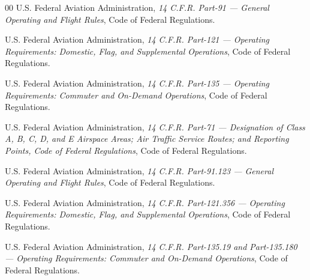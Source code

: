\documentclass[conference]{IEEEtran}
\begin{document}
\begin{thebibliography}{00}
U.S. Federal Aviation Administration,
\textit{14 C.F.R. Part-91 — General Operating and Flight Rules},
Code of Federal Regulations.

U.S. Federal Aviation Administration,
\textit{14 C.F.R. Part-121 — Operating Requirements: Domestic, Flag, and Supplemental Operations},
Code of Federal Regulations.

U.S. Federal Aviation Administration,
\textit{14 C.F.R. Part-135 — Operating Requirements: Commuter and On-Demand Operations},
Code of Federal Regulations.

U.S. Federal Aviation Administration,
\textit{14 C.F.R. Part-71 — Designation of Class A, B, C, D, and E Airspace Areas; Air Traffic Service Routes; and Reporting Points, Code of Federal Regulations},
Code of Federal Regulations.

U.S. Federal Aviation Administration,
\textit{14 C.F.R. Part-91.123 — General Operating and Flight Rules},
Code of Federal Regulations.

U.S. Federal Aviation Administration,
\textit{14 C.F.R. Part-121.356 — Operating Requirements: Domestic, Flag, and Supplemental Operations},
Code of Federal Regulations.

U.S. Federal Aviation Administration,
\textit{14 C.F.R. Part-135.19 and  Part-135.180 — Operating Requirements: Commuter and On-Demand Operations},
Code of Federal Regulations.

\end{thebibliography}
\end{document}
